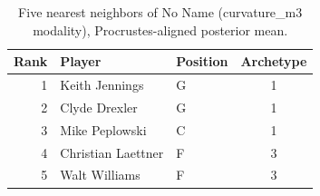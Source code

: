 \begin{table}[htbp]
  \centering\small
  \begin{tabular}{rllc}
    \toprule
    Rank & Player & Position & Archetype \\
    \midrule
    1 & Keith Jennings & G & 1 \\
    2 & Clyde Drexler & G & 1 \\
    3 & Mike Peplowski & C & 1 \\
    4 & Christian Laettner & F & 3 \\
    5 & Walt Williams & F & 3 \\
    \bottomrule
  \end{tabular}
  \caption{Five nearest neighbors of No Name (curvature_m3 modality), Procrustes-aligned posterior mean.}
  \label{tab:No_Name_neighbors_curvature_m3}
\end{table}

